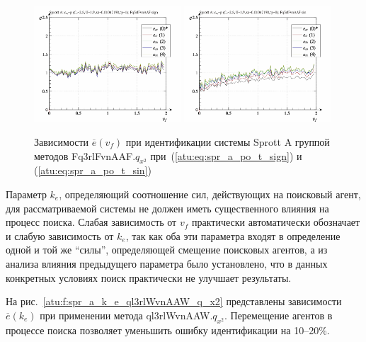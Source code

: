 \begin{figure}[htb!]
  \centerline{
    \includegraphics[width=0.49\textwidth]{p/cha/spr_a/Fq3rlFvnAAF_x2/sprott_a_id-p_v_f_sign.png}
    \hfill
    \includegraphics[width=0.49\textwidth]{p/cha/spr_a/Fq3rlFvnAAF_x2/sprott_a_id-p_v_f_sin.png}
  }
  \caption{Зависимости $\overline{e}(v_f)$ при идентификации системы Sprott A группой методов Fq3rlFvnAAF.$q_{x^2}$
   при~(\ref{atu:eq:spr_a_po_t_sign}) и (\ref{atu:eq:spr_a_po_t_sin})}
  \label{atu:f:spr_a_v_f_Fq3rlFvnAAF_q_x2}
\end{figure}

Параметр $k_e$, определяющий соотношение сил, действующих
на поисковый агент, для рассматриваемой системы не должен
иметь существенного влияния на процесс поиска.
Слабая зависимость от $v_f$ практически автоматически обозначает
и слабую зависимость от $k_e$, так как оба эти параметра
входят в определение одной и той же ``силы'',
определяющей смещение поисковых агентов, а из
анализа влияния предыдущего параметра было установлено,
что в данных конкретных условиях поиск практически не улучшает результаты.


На рис.~\ref{atu:f:spr_a_k_e_ql3rlWvnAAW_q_x2} представлены зависимости
$\overline{e}(k_e)$ при применении метода ql3rlWvnAAW.$q_{x^2}$.
Перемещение агентов в процессе поиска позволяет
уменьшить ошибку идентификации на 10--20\%.

